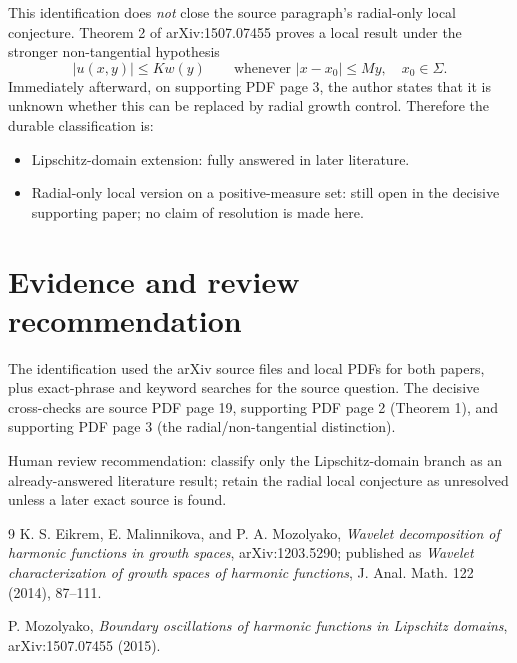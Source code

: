 \documentclass[11pt]{article}
\begin{document}
This identification does \emph{not} close the source paragraph's radial-only
local conjecture.  Theorem 2 of arXiv:1507.07455 proves a local result under the
stronger non-tangential hypothesis
\[
 |u(x,y)|\leq K w(y)\qquad\text{whenever }|x-x_0|\leq My,
 \quad x_0\in\Sigma.
\]
Immediately afterward, on supporting PDF page 3, the author states that it is
unknown whether this can be replaced by radial growth control.  Therefore the
durable classification is:

\begin{itemize}
  \item Lipschitz-domain extension: fully answered in later literature.
  \item Radial-only local version on a positive-measure set: still open in the
        decisive supporting paper; no claim of resolution is made here.
\end{itemize}

\section*{Evidence and review recommendation}

The identification used the arXiv source files and local PDFs for both papers,
plus exact-phrase and keyword searches for the source question.  The decisive
cross-checks are source PDF page 19, supporting PDF page 2 (Theorem 1), and
supporting PDF page 3 (the radial/non-tangential distinction).

Human review recommendation: classify only the Lipschitz-domain branch as an
already-answered literature result; retain the radial local conjecture as
unresolved unless a later exact source is found.

\begin{thebibliography}{9}
K. S. Eikrem, E. Malinnikova, and P. A. Mozolyako,
\emph{Wavelet decomposition of harmonic functions in growth spaces},
arXiv:1203.5290; published as \emph{Wavelet characterization of growth spaces
of harmonic functions}, J. Anal. Math. 122 (2014), 87--111.

P. Mozolyako,
\emph{Boundary oscillations of harmonic functions in Lipschitz domains},
arXiv:1507.07455 (2015).
\end{thebibliography}
\end{document}
